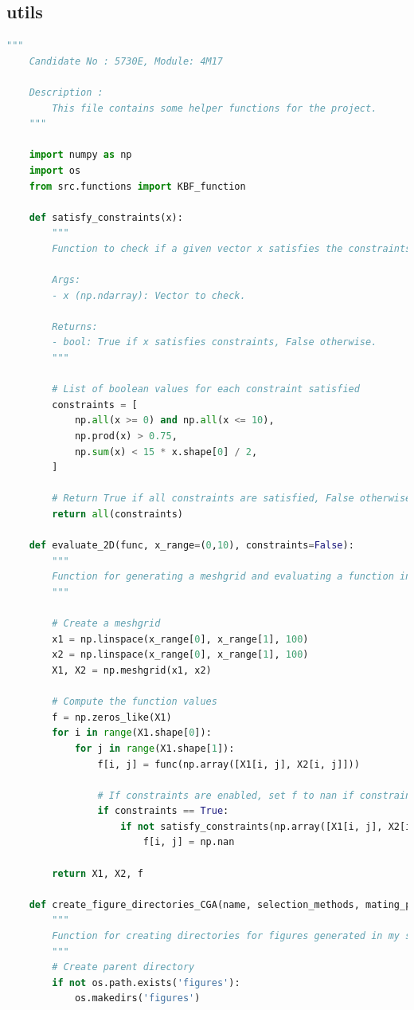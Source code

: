 \documentclass[10pt]{article}
\begin{document}
\subsection{utils}
\label{sec:utils}
\begin{lstlisting}[language=Python, caption=helper\_functions.py, label=helper_functionspy]
    """
    Candidate No : 5730E, Module: 4M17 
    
    Description :
        This file contains some helper functions for the project.
    """
    
    import numpy as np
    import os
    from src.functions import KBF_function
    
    def satisfy_constraints(x):
        """
        Function to check if a given vector x satisfies the constraints of the problem.
    
        Args:
        - x (np.ndarray): Vector to check.
    
        Returns:
        - bool: True if x satisfies constraints, False otherwise.
        """
    
        # List of boolean values for each constraint satisfied
        constraints = [
            np.all(x >= 0) and np.all(x <= 10),
            np.prod(x) > 0.75,
            np.sum(x) < 15 * x.shape[0] / 2,
        ]
    
        # Return True if all constraints are satisfied, False otherwise
        return all(constraints)
    
    def evaluate_2D(func, x_range=(0,10), constraints=False): 
        """
        Function for generating a meshgrid and evaluating a function in R^2.
        """
    
        # Create a meshgrid
        x1 = np.linspace(x_range[0], x_range[1], 100)
        x2 = np.linspace(x_range[0], x_range[1], 100)
        X1, X2 = np.meshgrid(x1, x2)
    
        # Compute the function values
        f = np.zeros_like(X1)
        for i in range(X1.shape[0]):
            for j in range(X1.shape[1]):
                f[i, j] = func(np.array([X1[i, j], X2[i, j]]))
    
                # If constraints are enabled, set f to nan if constraints are not satisfied
                if constraints == True:
                    if not satisfy_constraints(np.array([X1[i, j], X2[i, j]])):
                        f[i, j] = np.nan
            
        return X1, X2, f
    
    def create_figure_directories_CGA(name, selection_methods, mating_procedures, iters_list):
        """
        Function for creating directories for figures generated in my simulations.
        """
        # Create parent directory
        if not os.path.exists('figures'):
            os.makedirs('figures')
    

\end{lstlisting}
\end{document}
